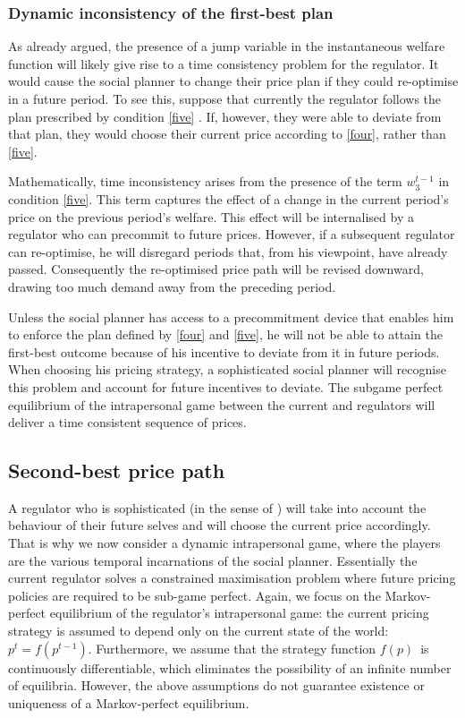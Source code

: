 \subsubsection{Dynamic inconsistency of the first-best plan}

\label{sec:dynam-incons-path}

As already argued, the presence of a jump variable in the instantaneous
welfare function will likely give rise to a time consistency problem for the
regulator. It would cause the social planner to change their price plan if
they could re-optimise in a future period. To see this, suppose that
currently the regulator follows the plan prescribed by condition \eqref{five}%
. If, however, they were able to deviate from that plan, they would choose
their current price according to \eqref{four}, rather than \eqref{five}.

Mathematically, time inconsistency arises from the presence of the term $%
w_{3}^{t-1}$ in condition \eqref{five}. This term captures the effect of a
change in the current period's price on the previous period's welfare. This
effect will be internalised by a regulator who can precommit to future
prices. However, if a subsequent regulator can re-optimise, he will
disregard periods that, from his viewpoint, have already passed.
Consequently the re-optimised price path will be revised downward, drawing
too much demand away from the preceding period.

Unless the social planner has access to a precommitment device that enables
him to enforce the plan defined by \eqref{four} and \eqref{five}, he will
not be able to attain the first-best outcome because of his incentive to
deviate from it in future periods. When choosing his pricing strategy, a
sophisticated social planner will recognise this problem and account for
future incentives to deviate. The subgame perfect equilibrium of the
intrapersonal game between the current and regulators will deliver a time
consistent sequence of prices.

\subsection{Second-best price path}

\label{sec:second-best-price}

A regulator who is sophisticated (in the sense of \citet{Donoghue1999}) will
take into account the behaviour of their future selves and will choose the
current price accordingly. That is why we now consider a dynamic
intrapersonal game, where the players are the various temporal incarnations
of the social planner. Essentially the current regulator solves a
constrained maximisation problem where future pricing policies are required
to be sub-game perfect. Again, we focus on the Markov-perfect equilibrium of
the regulator's intrapersonal game: the current pricing strategy is assumed
to depend only on the current state of the world: $p^{t}=f(p^{t-1})$.
Furthermore, we assume that the strategy function $f(p)$\ is continuously
differentiable, which eliminates the possibility of an infinite number of
equilibria. However, the above assumptions do not guarantee existence or
uniqueness of a Markov-perfect equilibrium.

